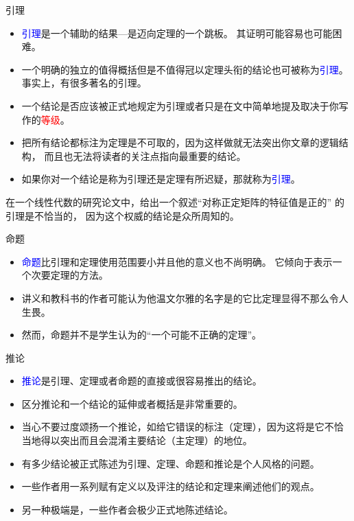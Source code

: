 \documentclass[13pt]{ctexbeamer}
\newcommand{\red}[1]{\textcolor{red}{#1}}
\newcommand{\blue}[1]{\textcolor{blue}{#1}}
\begin{document}
\begin{frame}{引理}

\begin{itemize}
	\item
	\blue{引理}是一个辅助的结果—是迈向定理的一个跳板。
	其证明可能容易也可能困难。

\item 一个明确的独立的值得概括但是不值得冠以定理头衔的结论也可被称为\blue{引理}。
事实上，有很多著名的引理。
\item
	一个结论是否应该被正式地规定为引理或者只是在文中简单地提及取决于你写作的\red{等级}。
\item
\alert{把所有结论都标注为定理是不可取的}，因为这样做就无法突出你文章的逻辑结构，
而且也无法将读者的关注点指向最重要的结论。
\item 如果你对一个结论是称为引理还是定理有所迟疑，那就称为\blue{引理}。
\end{itemize}


在一个线性代数的研究论文中，给出一个叙述``对称正定矩阵的特征值是正的'' 的引理是不恰当的，
因为这个权威的结论是众所周知的。

\end{frame}


\begin{frame}{命题}
\begin{itemize}
	\item
\blue{命题}比引理和定理使用范围要小并且他的意义也不尚明确。
它倾向于表示一个次要定理的方法。
\item 讲义和教科书的作者可能认为他温文尔雅的名字是的它比定理显得不那么令人生畏。
 \item 然而，命题并不是学生认为的“一个可能不正确的定理”。
\end{itemize}
\end{frame}

\begin{frame}{推论}
\begin{itemize}
\item \blue{推论}是引理、定理或者命题的直接或很容易推出的结论。
\item 区分推论和一个结论的延伸或者概括是非常重要的。
\item 当心不要过度颂扬一个推论，如给它错误的标注（定理），因为这将是它不恰当地得以突出而且会混淆主要结论（主定理）的地位。
\end{itemize}
\end{frame}

\begin{frame}
\begin{itemize}
\item 有多少结论被正式陈述为引理、定理、命题和推论是个人风格的问题。
\item 一些作者用一系列赋有定义以及评注的结论和定理来阐述他们的观点。
\item 另一种极端是，一些作者会极少正式地陈述结论。
\end{itemize}
\end{frame}
\end{document}
